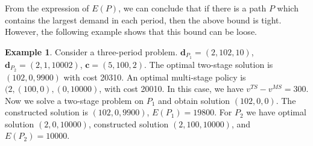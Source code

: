 \documentclass[10pt]{article}
\theoremstyle{plain}
\theoremstyle{definition}
\newtheorem{example}{Example}
\theoremstyle{remark}
\newcommand{\mb}{\mathbf}
\newcommand{\bd}{\mathbf{d}}
\begin{document}
From the expression of $E(P)$, we can conclude that {\color{blue}if there is a path $P$ which contains the largest demand in each period, then the above bound is tight}.
However, the following example shows that this bound can be loose.
\begin{example}
Consider a three-period problem.
$\bd_{P_1} = (2,102, 10)$, $\bd_{P_2} = (2,1,10002)$, $\mb{c} = (5,100, 2)$.  
The optimal two-stage solution is $(102, 0, 9900)$ with cost 20310.
An optimal multi-stage policy is $(2, (100,0), (0,10000)$, with cost 20010.
In this case, we have $v^{TS}-v^{MS} = 300$.
Now we solve a two-stage problem on $P_1$ and obtain solution $(102,0,0)$.
The constructed solution is $(102, 0, 9900)$, $E(P_1)=19800$.
For $P_2$ we have optimal solution $(2,0,10000)$, constructed solution $(2,100,10000)$,
and $E(P_2) = 10000$.
\end{example}
\end{document}
